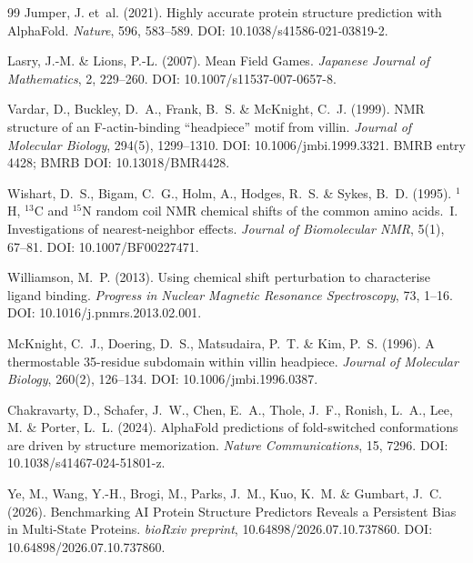 \documentclass[12pt,a4paper]{article}
\theoremstyle{remark}
\begin{document}
\begin{thebibliography}{99}
Jumper, J. et~al. (2021).
\newblock Highly accurate protein structure prediction with AlphaFold.
\newblock \textit{Nature}, 596, 583--589.
\newblock DOI: 10.1038/s41586-021-03819-2.

Lasry, J.-M. \& Lions, P.-L. (2007).
\newblock Mean Field Games.
\newblock \textit{Japanese Journal of Mathematics}, 2, 229--260.
\newblock DOI: 10.1007/s11537-007-0657-8.

Vardar, D., Buckley, D.~A., Frank, B.~S. \& McKnight, C.~J. (1999).
\newblock NMR structure of an F-actin-binding ``headpiece'' motif from villin.
\newblock \textit{Journal of Molecular Biology}, 294(5), 1299--1310.
\newblock DOI: 10.1006/jmbi.1999.3321.
\newblock BMRB entry 4428; BMRB DOI: 10.13018/BMR4428.

Wishart, D.~S., Bigam, C.~G., Holm, A., Hodges, R.~S. \& Sykes, B.~D. (1995).
\newblock $^1$H, $^{13}$C and $^{15}$N random coil NMR chemical shifts of the common amino acids.~I. Investigations of nearest-neighbor effects.
\newblock \textit{Journal of Biomolecular NMR}, 5(1), 67--81.
\newblock DOI: 10.1007/BF00227471.

Williamson, M.~P. (2013).
\newblock Using chemical shift perturbation to characterise ligand binding.
\newblock \textit{Progress in Nuclear Magnetic Resonance Spectroscopy}, 73, 1--16.
\newblock DOI: 10.1016/j.pnmrs.2013.02.001.

McKnight, C.~J., Doering, D.~S., Matsudaira, P.~T. \& Kim, P.~S. (1996).
\newblock A thermostable 35-residue subdomain within villin headpiece.
\newblock \textit{Journal of Molecular Biology}, 260(2), 126--134.
\newblock DOI: 10.1006/jmbi.1996.0387.

Chakravarty, D., Schafer, J.~W., Chen, E.~A., Thole, J.~F., Ronish, L.~A., Lee, M. \& Porter, L.~L. (2024).
\newblock AlphaFold predictions of fold-switched conformations are driven by structure memorization.
\newblock \textit{Nature Communications}, 15, 7296.
\newblock DOI: 10.1038/s41467-024-51801-z.

Ye, M., Wang, Y.-H., Brogi, M., Parks, J.~M., Kuo, K.~M. \& Gumbart, J.~C. (2026).
\newblock Benchmarking AI Protein Structure Predictors Reveals a Persistent Bias in Multi-State Proteins.
\newblock \textit{bioRxiv preprint}, 10.64898/2026.07.10.737860.
\newblock DOI: 10.64898/2026.07.10.737860.


\end{thebibliography}
\end{document}
